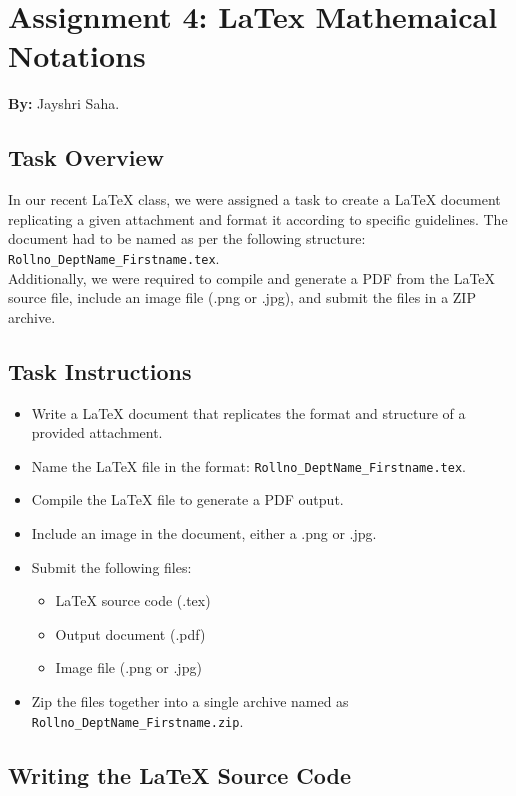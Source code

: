 \documentclass[a4paper,12pt]{article}
\begin{document}
\newpage

\section{Assignment 4: LaTex Mathemaical Notations}
\textbf{By:} Jayshri Saha.


\subsection{Task Overview}

In our recent LaTeX class, we were assigned a task to create a LaTeX document replicating a given attachment and format it according to specific guidelines. The document had to be named as per the following structure:\\ \texttt{Rollno\_DeptName\_Firstname.tex}.\\ 
Additionally, we were required to compile and generate a PDF from the LaTeX source file, include an image file (.png or .jpg), and submit the files in a ZIP archive.

\subsection{Task Instructions}

\begin{itemize}
    \item Write a LaTeX document that replicates the format and structure of a provided attachment.
    \item Name the LaTeX file in the format: \texttt{Rollno\_DeptName\_Firstname.tex}.
    \item Compile the LaTeX file to generate a PDF output.
    \item Include an image in the document, either a .png or .jpg.
    \item Submit the following files:
    \begin{itemize}
        \item LaTeX source code (.tex)
        \item Output document (.pdf)
        \item Image file (.png or .jpg)
    \end{itemize}
    \item Zip the files together into a single archive named as \texttt{Rollno\_DeptName\_Firstname.zip}.
\end{itemize}

\subsection{Writing the LaTeX Source Code}
\end{document}
